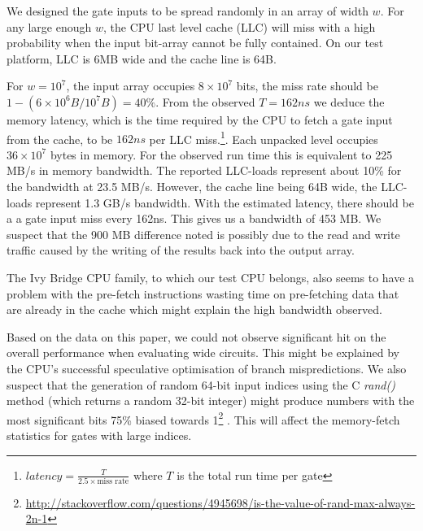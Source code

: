 We designed the gate inputs to be spread randomly in an array of width $w$. For any large enough $w$, the CPU last level cache (LLC) will miss with a high probability when the input bit-array cannot be fully contained. On our test platform, LLC is 6MB wide and the cache line is 64B\cite{agnor}. 
\par
For $w = 10^7$, the input array occupies $8 \times 10^7$ bits, the miss rate should be $1 - (6\times10^6B/10^7B) = 40\%$. From the observed $T = 162ns$ we deduce the memory latency, which is the time required by the CPU to fetch a gate input from the cache, to be $162ns$ per LLC miss.\footnote{ $latency = \frac{T}{2.5 \times \text{miss rate}}$ where $T$ is the total run time per gate}. Each unpacked level occupies $ 36\times10^7$ bytes in memory. For the observed run time this is equivalent to 225 MB/s in memory bandwidth. The reported LLC-loads represent about 10\% for the bandwidth at 23.5 MB/s. However, the cache line being 64B wide, the LLC-loads represent 1.3 GB/s bandwidth. With the estimated latency, there should be a a gate input miss every 162ns. This gives us a bandwidth of 453 MB. We suspect that the 900 MB difference noted is possibly due to the read and write traffic caused by the writing of the results back into the output array.
\par
The Ivy Bridge CPU family, to which our test CPU belongs, also seems to have a problem with the pre-fetch instructions wasting time on pre-fetching data that are already in the cache\cite{agnor} which might explain the high bandwidth observed.
\par
Based on the data on this paper, we could not observe significant hit on the overall performance when evaluating wide circuits. This might be explained by the CPU's successful speculative optimisation of branch mispredictions. We also suspect that the generation of random 64-bit input indices using the C \textit{rand()} method (which returns a random 32-bit integer) might produce numbers with the most significant bits 75\% biased towards 1\footnote{\url{http://stackoverflow.com/questions/4945698/is-the-value-of-rand-max-always-2n-1}}
. This will affect the memory-fetch statistics for gates with large indices.


